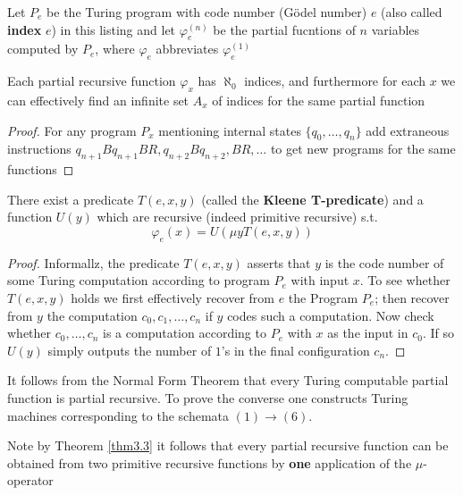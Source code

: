 \documentclass[11pt]{article}
\begin{document}
\begin{definition}[]
Let \(P_e\) be the Turing program with code number (Gödel number) \(e\) 
(also called \textbf{index} \(e\)) in this
listing and let \(\varphi_e^{(n)}\) be the partial fucntions of \(n\) variables
computed by \(P_e\), where \(\varphi_e\) abbreviates \(\varphi_e^{(1)}\)
\end{definition}

\begin{lemma}
Each partial recursive function \(\varphi_x\) has \(\aleph_0\) indices, and
furthermore for each \(x\) we can effectively find an infinite set \(A_x\) of
indices for the same partial function
\end{lemma}


\begin{proof}
For any program \(P_x\) mentioning internal states \(\{q_0,\dots,q_n\}\) add
extraneous instructions \(q_{n+1}Bq_{n+1}BR,q_{n+2}Bq_{n+2},BR,\dots\) to get
new programs for the same functions
\end{proof}
\begin{theorem}
\label{thm3.3}
There exist a predicate \(T(e,x,y)\) (called the \textbf{Kleene T-predicate}) and a
function \(U(y)\) which are recursive (indeed primitive recursive) s.t.
\begin{equation*}
\varphi_e(x)=U(\mu y T(e,x,y))
\end{equation*}
\end{theorem}

\begin{proof}
Informallz, the predicate \(T(e,x,y)\) asserts that \(y\) is the code number
of some Turing computation according to program \(P_e\) with input \(x\). To
see whether \(T(e,x,y)\) holds we first effectively recover from \(e\) the
Program \(P_e\); then recover from \(y\) the computation
\(c_0,c_1,\dots,c_n\) if \(y\) codes such a computation. Now check whether
\(c_0,\dots,c_n\) is a computation according to \(P_e\) with \(x\) as the
input in \(c_0\). If so \(U(y)\) simply outputs the number of \(1\)'s in the
final configuration \(c_n\).
\end{proof}

It follows from the Normal Form Theorem that every Turing computable partial
function is partial recursive. To prove the converse one constructs Turing
machines corresponding to the schemata \((1)\to(6)\).

Note by Theorem \ref{thm3.3} it follows that every partial recursive function
can be obtained from two primitive recursive functions by \textbf{one} application
of the \(\mu\)-operator
\end{document}
